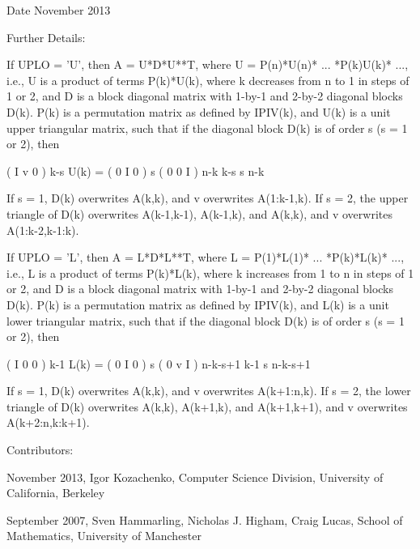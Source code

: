 \begin{DoxyDate}{Date}
November 2013 
\end{DoxyDate}
\begin{DoxyParagraph}{Further Details\+: }
\begin{DoxyVerb}  If UPLO = 'U', then A = U*D*U**T, where
     U = P(n)*U(n)* ... *P(k)U(k)* ...,
  i.e., U is a product of terms P(k)*U(k), where k decreases from n to
  1 in steps of 1 or 2, and D is a block diagonal matrix with 1-by-1
  and 2-by-2 diagonal blocks D(k).  P(k) is a permutation matrix as
  defined by IPIV(k), and U(k) is a unit upper triangular matrix, such
  that if the diagonal block D(k) is of order s (s = 1 or 2), then

             (   I    v    0   )   k-s
     U(k) =  (   0    I    0   )   s
             (   0    0    I   )   n-k
                k-s   s   n-k

  If s = 1, D(k) overwrites A(k,k), and v overwrites A(1:k-1,k).
  If s = 2, the upper triangle of D(k) overwrites A(k-1,k-1), A(k-1,k),
  and A(k,k), and v overwrites A(1:k-2,k-1:k).

  If UPLO = 'L', then A = L*D*L**T, where
     L = P(1)*L(1)* ... *P(k)*L(k)* ...,
  i.e., L is a product of terms P(k)*L(k), where k increases from 1 to
  n in steps of 1 or 2, and D is a block diagonal matrix with 1-by-1
  and 2-by-2 diagonal blocks D(k).  P(k) is a permutation matrix as
  defined by IPIV(k), and L(k) is a unit lower triangular matrix, such
  that if the diagonal block D(k) is of order s (s = 1 or 2), then

             (   I    0     0   )  k-1
     L(k) =  (   0    I     0   )  s
             (   0    v     I   )  n-k-s+1
                k-1   s  n-k-s+1

  If s = 1, D(k) overwrites A(k,k), and v overwrites A(k+1:n,k).
  If s = 2, the lower triangle of D(k) overwrites A(k,k), A(k+1,k),
  and A(k+1,k+1), and v overwrites A(k+2:n,k:k+1).\end{DoxyVerb}
 
\end{DoxyParagraph}
\begin{DoxyParagraph}{Contributors\+: }
\begin{DoxyVerb}  November 2013,  Igor Kozachenko,
                  Computer Science Division,
                  University of California, Berkeley

  September 2007, Sven Hammarling, Nicholas J. Higham, Craig Lucas,
                  School of Mathematics,
                  University of Manchester\end{DoxyVerb}
 
\end{DoxyParagraph}
